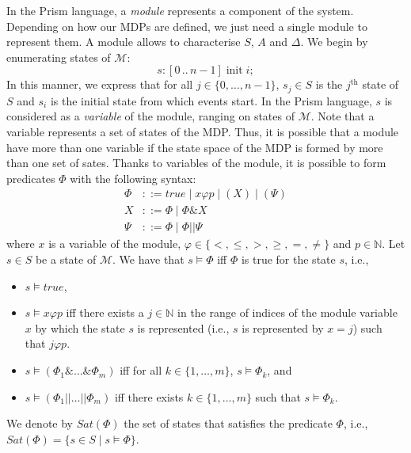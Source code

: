 In the Prism language, a \textit{module} represents a component of the system.
Depending on how our MDPs are defined, we just need a single module to
represent them. A module allows to characterise $S$, $A$ and $\Delta$. We begin by enumerating states of $\mathcal{M}$:
\[
  s: [0\, ..\, n-1] \; \text{init} \; i;
\]
In this manner, we express that for all $j \in \{0, \dots, n-1\}$, $s_j \in S$
is the $j^{\text{th}}$ state of $S$ and $s_i$ is the initial state from which events start. In the Prism language, $s$ is considered as a \textit{variable} of the module, ranging on states of $\mathcal{M}$. Note that a variable represents a set of states of the MDP. Thus, it is possible that a module have more than one variable if the state space of the MDP is formed by more than one set of sates.
Thanks to variables of the module, it is possible to form predicates $\Phi$ with the following  syntax:
\begin{align*}
  \Phi &::= true \; | \; x \varphi p \; | \; (X) \; | \; (\Psi) \\
  X &::= \Phi \; | \; \Phi \& X \\
  \Psi &::= \Phi \; | \; \Phi || \Psi
\end{align*}
where $x$ is a variable of the module, $\varphi \in \{<, \leq, >, \geq, =, \neq\}$
and $p \in \mathbb{N}$. Let $s \in S$ be a state of $\mathcal{M}$. We have that $s \models \Phi$ iff $\Phi$ is true for the state $s$, i.e.,
\begin{itemize}
  \item $s \models true$,
  \item $s \models x \varphi p$ iff there exists a $j \in \mathbb{N}$ in the range of indices of the module variable $x$ by which the state $s$ is represented (i.e., $s$ is represented by $x=j$) such that $j \varphi p$.
  \item $s \models (\Phi_1 \& \dots \& \Phi_m)$ iff
    for all $k \in \{1, \dots, m\}$, $s \models \Phi_k$, and
  \item $s \models (\Phi_1 || \dots || \Phi_m)$ iff
    there exists $k \in \{1, \dots, m\}$ such that $s \models \Phi_k$.
\end{itemize}
We denote by $Sat(\Phi)$ the set of states that satisfies the predicate $\Phi$, i.e., $Sat(\Phi) = \{s \in S \; | \; s \models \Phi\}$. \\

